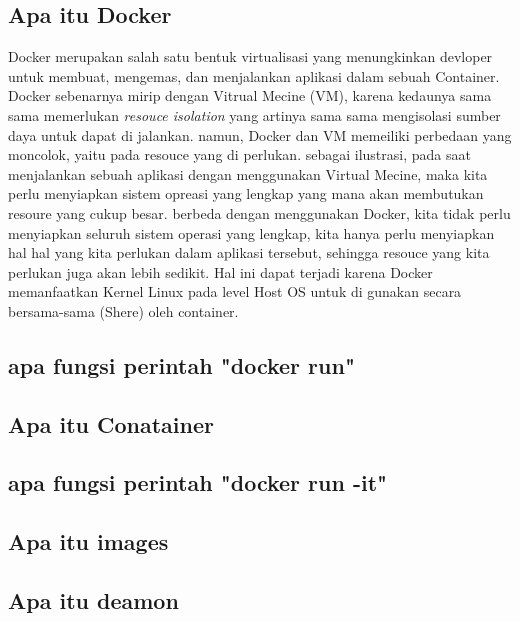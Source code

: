 \documentclass[11pt,a4paper]{article}
\begin{document}
\subsection*{Apa itu Docker}
Docker merupakan salah satu bentuk virtualisasi yang menungkinkan devloper untuk membuat, 
mengemas, dan menjalankan aplikasi dalam sebuah Container. Docker sebenarnya mirip dengan 
Vitrual Mecine (VM), karena kedaunya sama sama memerlukan \textit{resouce isolation} yang artinya
sama sama mengisolasi sumber daya untuk dapat di jalankan. namun, Docker dan VM memeiliki
perbedaan yang moncolok, yaitu pada resouce yang di perlukan. sebagai ilustrasi, pada saat 
menjalankan sebuah aplikasi dengan menggunakan Virtual Mecine, maka kita perlu menyiapkan 
sistem opreasi yang lengkap yang mana akan membutukan resoure yang cukup besar. berbeda dengan
menggunakan Docker, kita tidak perlu menyiapkan seluruh sistem operasi yang lengkap, kita hanya
perlu menyiapkan hal hal yang kita perlukan dalam aplikasi tersebut, sehingga resouce yang kita 
perlukan juga akan lebih sedikit. Hal ini dapat terjadi karena Docker memanfaatkan Kernel Linux
pada level Host OS untuk di gunakan secara bersama-sama (Shere) oleh container.


\subsection*{apa fungsi perintah "docker run"}

\subsection*{Apa itu Conatainer}

\subsection*{apa fungsi perintah "docker run -it"}

\subsection*{Apa itu images}

\subsection*{Apa itu deamon}
\end{document}
